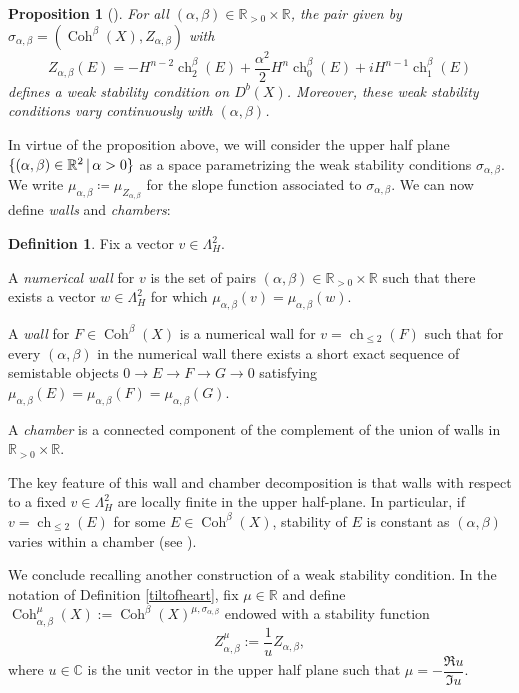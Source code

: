 \documentclass[11pt]{amsart}
\newtheorem{proposition}[thm]{Proposition}
\theoremstyle{definition}
\newtheorem{definition}[thm]{Definition}
\newcommand{\C}{\mathbb{C}}
\newcommand{\R}{\mathbb{R}}
\DeclareMathOperator{\Ch}{ch}
\DeclareMathOperator{\Coh}{Coh}
\newcommand{\st}{\,|\,}					%
\DeclarePairedDelimiter{\set}{\lbrace}{\rbrace}
\begin{document}
\begin{proposition}[{\cite[Proposition~2.12]{BLMS17}}] \label{def_tilt_stability}
For all $(\alpha,\beta)\in \R_{>0}\times \R$, the pair given by  $\sigma_{\alpha,\beta}=(\Coh^\beta(X), Z_{\alpha,\beta})$ with
\[
Z_{\alpha,\beta}(E) = -H^{n-2}\Ch_2^\beta(E) + \dfrac{\alpha^2}{2}H^n\Ch_0^\beta(E) + i H^{n-1}\Ch_1^\beta(E)
\]
defines a weak stability condition on $D^b(X)$. Moreover, these weak stability conditions vary continuously with $(\alpha,\beta)$.
\end{proposition}

In virtue of the proposition above, we will consider the upper half plane 
$\set{(\alpha,\beta)\in \R^2  \st \alpha >0 }$ as a space parametrizing the weak stability conditions $\sigma_{\alpha,\beta}$. We write $\mu_{\alpha,\beta}\coloneqq \mu_{Z_{\alpha,\beta}}$ for the slope function associated to $\sigma_{\alpha,\beta}$.  We can now define \textit{walls} and \textit{chambers}:

\begin{definition}\label{def_walls}
Fix a vector $v\in \Lambda^2_H$. 

A \textit{numerical wall} for $v$ is the set of pairs $(\alpha,\beta)\in \R_{>0}\times \R$ such that there exists a vector $w\in \Lambda^2_H$ for which $\mu_{\alpha,\beta}(v)=\mu_{\alpha,\beta}(w)$.

A \textit{wall} for $F\in \Coh^\beta(X)$ is a numerical wall for $v=\Ch_{\leq 2}(F)$ such that for every $(\alpha,\beta)$ in the numerical wall there exists a short exact sequence of semistable objects $0\to E\to F\to G\to 0$ satisfying $\mu_{\alpha,\beta}(E)=\mu_{\alpha,\beta}(F)=\mu_{\alpha,\beta}(G)$.

A \textit{chamber} is a connected component of the complement of the union of walls in $\R_{>0}\times\R$.
\end{definition}

The key feature of this wall and chamber decomposition is that walls with respect to a fixed $v\in \Lambda^2_H$ are locally finite in the upper half-plane. In particular, if $v=\Ch_{\leq 2}(E)$ for some $E\in \Coh^\beta(X)$, stability of $E$ is constant as $(\alpha,\beta)$ varies within a chamber (see \cite[Proposition~B.5]{BMS16}). 

We conclude recalling another construction of a weak stability condition. In the notation of Definition \ref{tiltofheart}, fix $\mu \in \R$ and define $\Coh^{\mu}_{\alpha, \beta}(X) := \Coh^{\beta}(X)^{\mu,\sigma_{\alpha,\beta}}$ endowed with a stability function
\[
Z^\mu_{\alpha,\beta} := \dfrac{1}{u} Z_{\alpha,\beta},
\]
where $u\in \C$ is the unit vector in the upper half plane such that $\mu = -\dfrac{\Re u}{\Im u}$.
\end{document}
